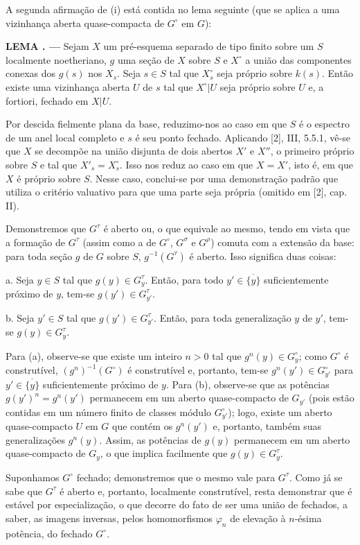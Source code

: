 \documentclass[11pt,twoside,openany]{book}
\numberwithin{equation}{section}
\newcommand{\src}[1]{%
  \phantomsection\hypertarget{src:#1}{}%
  \marginpar{\raggedleft\footnotesize\sffamily #1}%
}
\theoremstyle{plain}
\theoremstyle{definition}
\theoremstyle{remark}
\newcommand{\result}[2]{%
  \par\medskip\noindent\textbf{#1%
  \if\relax\detokenize{#2}\relax\else\space#2\fi. ---}\enspace
}
\newcommand{\FgaUnitKey}{frontmatter}
\renewcommand{\src}[1]{%
  \phantomsection\hypertarget{src:\FgaUnitKey:#1}{}%
  \marginpar{\raggedleft\footnotesize\sffamily #1}%
}
\begin{document}
A segunda afirmação de (i) está contida no lema seguinte (que se aplica a uma
vizinhança aberta quase-compacta de $G^\circ$ em $G$):

\result{LEMA}{1.3} Sejam $X$ um pré-esquema separado de tipo finito sobre um
$S$ localmente noetheriano, $g$ uma seção de $X$ sobre $S$ e $X^\circ$ a união
das componentes conexas dos $g(s)$ nos $X_s$. Seja $s\in S$ tal que
$X_s^\circ$ seja próprio sobre $k(s)$. Então existe uma vizinhança aberta $U$
de $s$ tal que $X^\circ|U$ seja próprio sobre $U$ e, a fortiori, fechado em
$X|U$.

Por descida fielmente plana da base, reduzimo-nos ao caso em que $S$ é o
espectro de um anel local completo e $s$ é seu ponto fechado. Aplicando [2],
III, 5.5.1, vê-se que $X$ se decompõe na união disjunta de dois abertos $X'$ e
$X''$, o primeiro próprio sobre $S$ e tal que $X'_s=X_s^\circ$. Isso nos reduz
ao caso em que $X=X'$, isto é, em que $X$ é próprio sobre $S$. Nesse caso,
conclui-se por uma demonstração padrão que utiliza o critério valuativo para
que uma parte seja própria (omitido em [2], cap. II).

Demonstremos que $G^\tau$ é aberto ou, o que equivale ao mesmo, tendo em vista
que a formação de $G^\tau$ (assim como a de $G^\circ$, $G^\sigma$ e $G^\rho$)
comuta com a extensão da base: para toda seção $g$ de $G$ sobre $S$,
$g^{-1}(G^\tau)$ é aberto. Isso significa duas coisas:

\medskip
\noindent a. Seja $y\in S$ tal que $g(y)\in G_y^\tau$. Então, para todo
$y'\in\overline{\{y\}}$ suficientemente próximo de $y$, tem-se
$g(y')\in G_{y'}^\tau$.

\medskip
\noindent b. Seja $y'\in S$ tal que $g(y')\in G_{y'}^\tau$. Então, para toda
generalização $y$ de $y'$, tem-se $g(y)\in G_y^\tau$.

Para (a), observe-se que existe um inteiro $n>0$ tal que
$g^n(y)\in G_y^\circ$; como $G^\circ$ é construtível,
$(g^n)^{-1}(G^\circ)$ é construtível e, portanto, tem-se
$g^n(y')\in G_{y'}^\circ$ para $y'\in\overline{\{y\}}$ suficientemente
próximo de $y$. Para (b), observe-se que as potências
$g(y')^n=g^n(y')$ permanecem em um aberto quase-compacto de $G_{y'}$ (pois
estão contidas em um número finito de classes módulo $G_{y'}^\circ$); logo,
existe um aberto quase-compacto $U$ em $G$ que contém os $g^n(y')$ e, portanto,
também suas generalizações $g^n(y)$. Assim, as potências de $g(y)$ permanecem
em um aberto quase-compacto de $G_y$, o que implica facilmente que
$g(y)\in G_y^\tau$.
\src{226}
Suponhamos $G^\circ$ fechado; demonstremos que o mesmo vale para $G^\tau$.
Como já se sabe que $G^\tau$ é aberto e, portanto, localmente construtível,
resta demonstrar que é estável por especialização, o que decorre do fato de ser
uma união de fechados, a saber, as imagens inversas, pelos homomorfismos
$\varphi_n$ de elevação à $n$-ésima potência, do fechado $G^\circ$.
\end{document}
